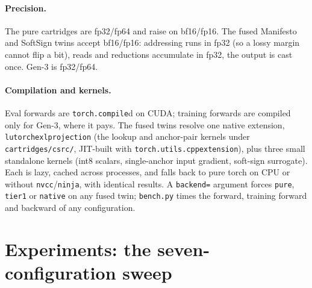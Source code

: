 \documentclass[11pt]{article}
\DeclareRobustCommand{\code}[1]{{\renewcommand{\_}{\textunderscore\allowbreak}\texttt{#1}}}
\begin{document}
\paragraph{Precision.} The pure cartridges are fp32/fp64 and raise on bf16/fp16. The fused Manifesto and
SoftSign twins accept bf16/fp16: addressing runs in fp32 (so a lossy margin cannot flip a bit), reads and
reductions accumulate in fp32, the output is cast once. Gen-3 is fp32/fp64.

\paragraph{Compilation and kernels.} Eval forwards are \code{torch.compile}d on CUDA; training forwards
are compiled only for Gen-3, where it pays. The fused twins resolve one native extension,
\code{lutorch\_ex\_lprojection} (the lookup and anchor-pair kernels under \code{cartridges/csrc/},
JIT-built with \code{torch.utils.cpp\_extension}), plus three small standalone kernels (int8 scalars,
single-anchor input gradient, soft-sign surrogate). Each is lazy, cached across processes, and falls back
to pure torch on CPU or without \code{nvcc}/\code{ninja}, with identical results. A \code{backend=}
argument forces \code{pure}, \code{tier1} or \code{native} on any fused twin; \code{bench.py} times the
forward, training forward and backward of any configuration.

\section{Experiments: the seven-configuration sweep}
\label{sec:ml}
\end{document}
